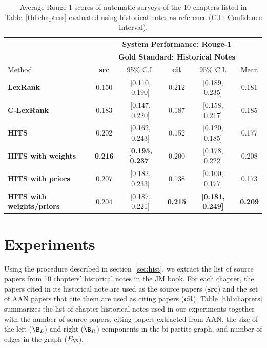 
\begin{table}[ht!]
\centering
{\small
\begin{tabular}{l@{\hspace{2cm}}cc@{\hspace{1cm}}cc@{\hspace{1cm}}c} \hline
       & \multicolumn{5}{c}{{\bf System Performance: Rouge-1}}\\
       & \multicolumn{5}{c}{{\bf Gold Standard: Historical Notes}}\\ \hline
Method & {\bf  src} & 95\% C.I. & {\bf cit} & 95\% C.I. & Mean\\ \hline \hline
{\bf LexRank}                   & 0.150 & [0.110, 0.190]  & 0.212 & [0.189, 0.235]  & 0.181\\
{\bf C-LexRank}                 & 0.183 & [0.147, 0.220]  & 0.187 & [0.158, 0.217]  & 0.185\\
{\bf HITS}                      & 0.202 & [0.162, 0.243]  & 0.152 & [0.120, 0.185]  & 0.177\\
{\bf HITS with weights}         & {\bf 0.216} & {\bf [0.195, 0.237]}  & 0.200 & [0.178, 0.222]  & 0.208\\
{\bf HITS with priors}          & 0.207 & [0.182, 0.233]  & 0.138 & [0.100, 0.177]  & 0.173\\
{\bf HITS with weights/priors}  & 0.204 & [0.187, 0.221]  & {\bf 0.215} & {\bf [0.181, 0.249]}  & {\bf 0.209}\\ \hline 
\end{tabular}}
\caption{Average Rouge-1 scores of automatic surveys of the 10 chapters listed in Table~\ref{tbl:chapters} evaluated using historical notes as reference (C.I.: Confidence Interval).}\label{tbl:rouge1-hist}
\end{table}

\section{Experiments}
\label{sec:exp}

Using the procedure described in section~\ref{sec:hist}, we extract the list of source papers from 10 chapters' historical notes in the JM book. For each chapter, the papers cited in its historical note are used as the source papers ({\bf src}) and the set of AAN papers that cite them are used as citing papers ({\bf cit}). 
Table~\ref{tbl:chapters} summarizes the list of chapter historical notes used in our experiments together with the number of source papers,  citing papers extracted from AAN, the size of the left ($\B_L$) and right ($\B_R$) components in the bi-partite graph, and number of edges in the graph ($E_\B$).

